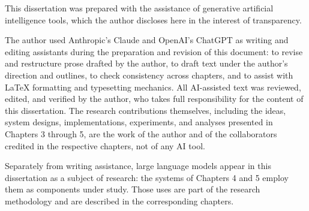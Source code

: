 This dissertation was prepared with the assistance of generative
artificial intelligence tools, which the author discloses here in the
interest of transparency.

The author used Anthropic's Claude and OpenAI's ChatGPT
as writing and editing assistants during the preparation and revision
of this document: to revise and restructure prose drafted by the
author, to draft text under the author's direction and outlines, to
check consistency across chapters, and to assist with LaTeX
formatting and typesetting mechanics. All AI-assisted text was
reviewed, edited, and verified by the author, who takes full
responsibility for the content of this dissertation. The research
contributions themselves, including the ideas, system designs,
implementations, experiments, and analyses presented in Chapters 3
through 5, are the work of the author and of the collaborators
credited in the respective chapters, not of any AI tool.

Separately from writing assistance, large language models appear in
this dissertation as a subject of research: the systems of Chapters 4
and 5 employ them as components under study. Those uses are part of
the research methodology and are described in the corresponding
chapters.
